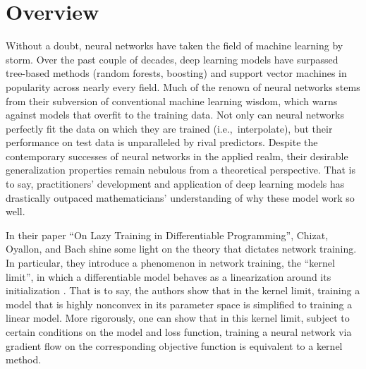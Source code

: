 \documentclass{article}
\begin{document}
\vspace*{\fill}

\pagebreak


\vspace*{\fill}

\begin{centering}
\tableofcontents
\end{centering}

\vspace*{\fill}

\pagebreak

\section{Overview}
Without a doubt, neural networks have taken the field of machine learning by storm. Over the past couple of decades, deep learning models have surpassed tree-based methods (random forests, boosting) and support vector machines in popularity across nearly every field. Much of the renown of neural networks stems from their subversion of conventional machine learning wisdom, which warns against models that overfit to the training data. Not only can neural networks perfectly fit the data on which they are trained (i.e.,~interpolate), but their performance on test data is unparalleled by rival predictors. Despite the contemporary successes of neural networks in the applied realm, their desirable generalization properties remain nebulous from a theoretical perspective. That is to say, practitioners' development and application of deep learning models has drastically outpaced mathematicians' understanding of why these model work so well.

In their paper \enquote{On Lazy Training in Differentiable Programming}, Chizat, Oyallon, and Bach shine some light on the theory that dictates network training. In particular, they introduce a phenomenon in network training, the \enquote{kernel limit}, in which a differentiable model behaves as a linearization around its initialization \cite{chizat2018lazy}. That is to say, the authors show that in the kernel limit, training a model that is highly nonconvex in its parameter space is simplified to training a linear model. More rigorously, one can show that in this kernel limit, subject to certain conditions on the model and loss function, training a neural network via gradient flow on the corresponding objective function is equivalent to a kernel method.
\end{document}
